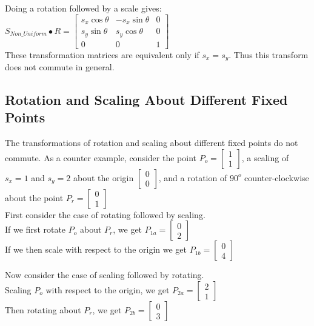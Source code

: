 \documentclass[a4paper,10pt]{scrartcl}
\begin{document}
Doing a rotation followed by a scale gives: \\

$S_{Non\_Uniform} \bullet R = \begin{bmatrix}
		  s_x\cos{\theta} & -s_x\sin{\theta} & 0 \\
		  s_y\sin{\theta} & s_y\cos{\theta} & 0 \\
		  0 & 0 & 1
               \end{bmatrix}
$ \\

These transformation matrices are equivalent only if $s_x = s_y$. Thus this transform does not commute in general.

\subsection{Rotation and Scaling About Different Fixed Points}

The transformations of rotation and scaling about different fixed points do not commute. As a counter example, consider 
the point $P_o = \begin{bmatrix} 1 \\ 1 \end{bmatrix}$, a scaling of $s_x = 1$ and $s_y = 2$ about the origin
$\begin{bmatrix} 0 \\ 0\end{bmatrix}$, and a rotation of $90^o$ counter-clockwise about the point $P_r = \begin{bmatrix} 0 \\ 1\end{bmatrix}$\\

First consider the case of rotating followed by scaling.\\
If we first rotate $P_o$ about $P_r$, we get $P_{1a} = \begin{bmatrix} 0 \\ 2 \end{bmatrix}$\\
If we then scale with respect to the origin we get $P_{1b} = \begin{bmatrix} 0 \\ 4\end{bmatrix}$


Now consider the case of scaling followed by rotating.\\
Scaling $P_o$ with respect to the origin, we get $P_{2a} = \begin{bmatrix} 2 \\ 1\end{bmatrix}$\\
Then rotating about $P_r$, we get $P_{2b} = \begin{bmatrix} 0 \\ 3\end{bmatrix}$\\
\end{document}
